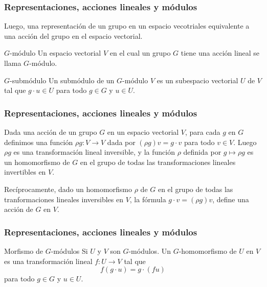 \documentclass[11pt,spanish]{beamer}
\theoremstyle{mystyle}
\begin{document}
    \begin{frame}
	\frametitle{Representaciones, acciones lineales y m\'odulos}
	Luego, una representaci\'on de un grupo en un espacio vecotriales equivalente a una acci\'on del
	grupo en el espacio vectorial.
	\begin{block}{$G$-m\'odulo}
		Un espacio vectorial $V$ en el cual un grupo $G$ tiene una acci\'on lineal se llama $G$-m\'odulo.
	\end{block}
    \begin{block}{$G$-subm\'odulo}
    	Un subm\'odulo de un $G$-m\'odulo $V$ es un subespacio vectorial $U$ de $V$ tal que
    	$g \cdot u \in U$ para todo $g \in G$ y $u \in U$.
    \end{block}
    \end{frame}
    \begin{frame}
	\frametitle{Representaciones, acciones lineales y m\'odulos}
	\begin{theorem}%
	    Dada una acci\'on de un grupo $G$ en un espacio vectorial $V$, para cada $g$ en $G$
	    definimos una funci\'on $\rho g : V \to V$ dada por $(\rho g)v = g \cdot v$ para todo $v \in V$.
	    Luego $\rho g$ es una transformaci\'on lineal inversible, y la funci\'on $\rho$ definida
	    por $g \mapsto \rho g$ es un homomorfismo de $G$ en el grupo de todas las transformaciones
	    lineales invertibles en $V$.
	    
	    Rec\'iprocamente, dado un homomorfismo $\rho$ de $G$ en el
	    grupo de todas las tranformaciones lineales inversibles en $V$, la f\'ormula
	    $g \cdot v = (\rho g)v$, define una acci\'on de $G$ en $V$.
	\end{theorem}
    \end{frame}

    \begin{frame}
	\frametitle{Representaciones, acciones lineales y m\'odulos}
    \begin{block}{Morfismo de $G$-m\'odulos}
    	Si $U$ y $V$ son $G$-m\'odulos. Un $G$-homomorfismo de $U$ en $V$ es una transformaci\'on
    	lineal $f : U \to V$ tal que $$ f(g \cdot u) = g \cdot (fu)$$  para todo $g \in G$ y $u \in U$.
    \end{block}
    \end{frame}
\end{document}
